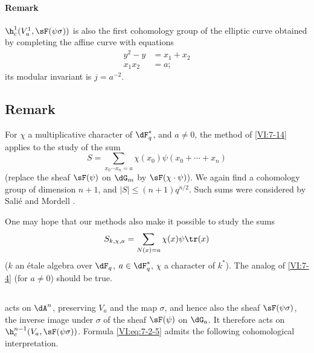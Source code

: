 \paragraph{Remark}

$\h_c^1(V_a^1,\sF(\psi\sigma))$ is also the first cohomology group of 
the elliptic curve obtained by completing the affine curve with equations 
\begin{align*}
  y^2-y &= x_1+x_2 \\
  x_1 x_2 &= a \text{;} 
\end{align*}
its modular invariant is $j=a^{-2}$. 





\subsection{Remark}\label{VI:7-18}

For $\chi$ a multiplicative character of $\dF_q^\ast$, and $a\ne 0$, the 
method of \ref{VI:7-14} applies to the study of the sum 
\[
  S = \sum_{x_0\dotsm x_n = a} \chi(x_0) \psi(x_0+\cdots + x_n) 
\]
(replace the sheaf $\sF(\psi)$ on $\dG_m$ by $\sF(\chi\cdot \psi)$). We 
again find a cohomology group of dimension $n+1$, and 
$|S|\leqslant (n+1)q^{n/2}$. Such sums were considered by 
Salié and Mordell .

One may hope that our methods also make it possible to study the sums 
\[
  S_{k,\chi,a} = \sum_{N(x)=a} \chi(x) \psi \tr(x) 
\]
($k$ an étale algebra over $\dF_q$, $a\in \dF_q^\ast$, $\chi$ a character of 
$k^\ast$). The analog of \ref{VI:7-4} (for $a\ne 0$) should be true. 





\subsection{}\label{VI:7-19}

 acts on $\dA^n$, preserving $V_a$ and 
the map $\sigma$, and hence also the sheaf $\sF(\psi\sigma)$, the inverse 
image under $\sigma$ of the sheaf $\sF(\psi)$ on $\dG_a$. It therefore acts 
on $\h_c^{n-1}(V_a,\sF(\psi\sigma))$. Formula \eqref{VI:eq:7-2-5} admits 
the following cohomological interpretation.





